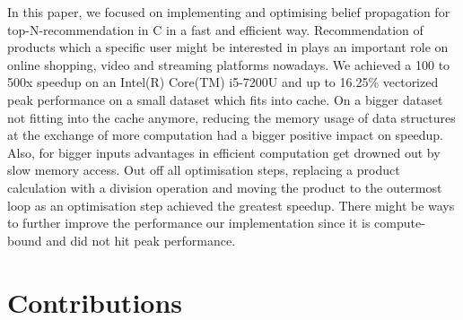 \documentclass[letterpaper]{article}
\begin{document}
In this paper, we focused on implementing and optimising belief propagation for top-N-recommendation in C in a fast and efficient way.
Recommendation of products which a specific user might be interested in plays an important role on online shopping, video and streaming platforms nowadays. 
We achieved a 100 to 500x speedup on an Intel(R) Core(TM) i5-7200U and up to 16.25\% vectorized peak performance on a small dataset which fits into cache.
On a bigger dataset not fitting into the cache anymore, reducing the memory usage of data structures at the exchange of more computation had a bigger positive impact on speedup.
Also, for bigger inputs advantages in efficient computation get drowned out by slow memory access.
Out off all optimisation steps, replacing a product calculation with a division operation and moving the product to the outermost loop as an optimisation step achieved the greatest speedup.\sr{*}
There might be ways to further improve the performance our implementation since it is compute-bound and did not hit peak performance.\sr{*}


\section{Contributions}%


\end{document}
